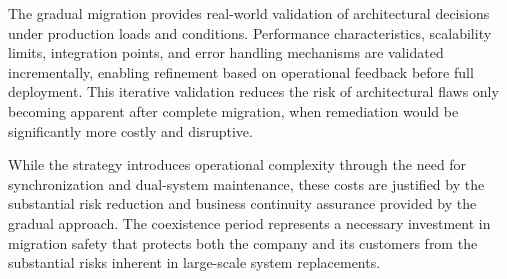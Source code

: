 The gradual migration provides real-world validation of architectural decisions under production loads and conditions. Performance characteristics, scalability limits, integration points, and error handling mechanisms are validated incrementally, enabling refinement based on operational feedback before full deployment. This iterative validation reduces the risk of architectural flaws only becoming apparent after complete migration, when remediation would be significantly more costly and disruptive.

While the strategy introduces operational complexity through the need for synchronization and dual-system maintenance, these costs are justified by the substantial risk reduction and business continuity assurance provided by the gradual approach. The coexistence period represents a necessary investment in migration safety that protects both the company and its customers from the substantial risks inherent in large-scale system replacements.